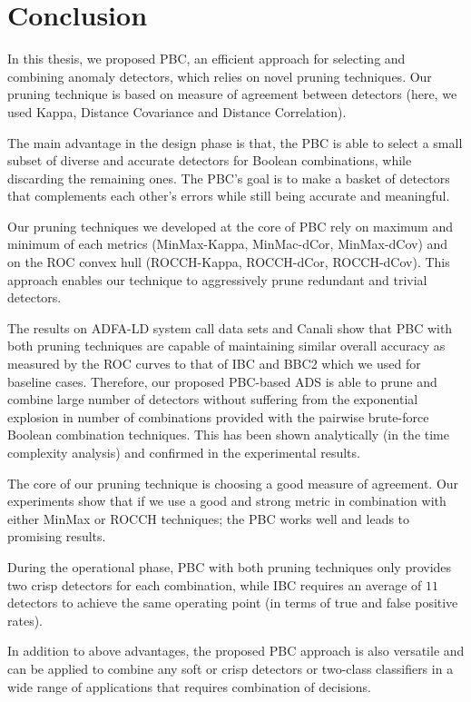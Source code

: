 \chapter{Conclusion} \label{chapter5}
In this thesis, we proposed PBC, an efficient approach for selecting and combining anomaly detectors, which relies on novel pruning techniques. Our pruning technique is based on measure of agreement between detectors (here, we used Kappa, Distance Covariance and Distance Correlation).

The main advantage in the design phase is that, the PBC is able to select a small subset of diverse and accurate detectors for Boolean combinations, while discarding the remaining ones. The PBC's goal is to make a basket of detectors that complements each other’s errors while still being accurate and meaningful.

Our pruning techniques we developed at the core of PBC rely on maximum and minimum of each metrics (MinMax-Kappa, MinMac-dCor, MinMax-dCov) and on the ROC convex hull (ROCCH-Kappa, ROCCH-dCor, ROCCH-dCov). This approach enables our technique to aggressively prune redundant and trivial detectors.

The results on ADFA-LD system call data sets and Canali show that PBC with both pruning techniques are capable of maintaining similar overall accuracy as measured by the ROC curves to that of IBC and BBC2 which we used for baseline cases.
Therefore, our proposed PBC-based ADS is able to prune and combine large number of detectors without suffering from the exponential explosion in number of combinations provided with the pairwise brute-force Boolean combination techniques.
This has been shown analytically (in the time complexity analysis) and confirmed in the experimental results.

The core of our pruning technique is choosing a good measure of agreement. Our experiments show that if we use a good and strong metric in combination with either MinMax or ROCCH techniques; the PBC works well and leads to promising results.

During the operational phase, PBC with both pruning techniques only provides two crisp detectors for each combination, while IBC requires an average of $11$ detectors to achieve the same operating point (in terms of true and false positive rates).

In addition to above advantages, the proposed PBC approach is also versatile and can be applied to combine any soft or crisp detectors or two-class classifiers in a wide range of applications that requires combination of decisions.



